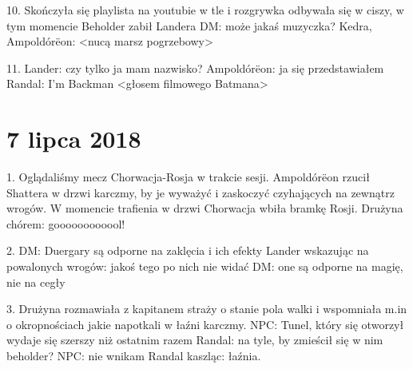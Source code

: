 \documentclass[10pt,twoside,twocolumn]{book}
\begin{document}
10. Skończyła się playlista na youtubie w tle i rozgrywka odbywała się w ciszy, w tym momencie Beholder zabił Landera
DM: może jakaś muzyczka?
Kedra, Ampoldórëon: <nucą marsz pogrzebowy>

11. Lander: czy tylko ja mam nazwisko?
Ampoldórëon: ja się przedstawiałem
Randal: I'm Backman <głosem filmowego Batmana>

\section*{7 lipca 2018}

1. Oglądaliśmy mecz Chorwacja-Rosja w trakcie sesji. Ampoldórëon rzucił Shattera w drzwi karczmy, by je wyważyć i zaskoczyć czyhających na zewnątrz wrogów. W momencie trafienia  w drzwi Chorwacja wbiła bramkę Rosji.
Drużyna chórem: goooooooooool!

2. DM: Duergary są odporne na zaklęcia i ich efekty
Lander wskazując na powalonych wrogów: jakoś tego po nich nie widać
DM: one są odporne na magię, nie na cegły

3. Drużyna rozmawiała z kapitanem straży o stanie pola walki i wspomniała m.in o okropnościach jakie napotkali w łaźni karczmy.
NPC: Tunel, który się otworzył wydaje się szerszy niż ostatnim razem
Randal: na tyle, by zmieścił się w nim beholder?
NPC: nie wnikam
Randal kaszląc: łaźnia.
\end{document}
